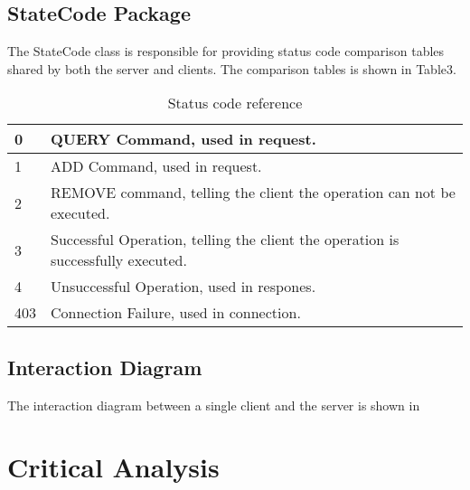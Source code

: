 \documentclass[a4paper]{article}
\begin{document}
\subsection{StateCode Package}
The StateCode class is responsible for providing status code comparison tables shared by both the server and clients. The comparison tables is shown in Table3.
\begin{table}[H]
	\caption{Status code reference}
	\begin{tabular}{|p{0.6cm}|p{10.7cm}|}
		\hline
		0 & QUERY Command, used in request.\\ \hline
		1 & ADD Command, used in request.   \\ \hline
		2 & REMOVE command, telling the client the operation can not be executed. \\ \hline
		3 & Successful Operation, telling the client the operation is successfully executed.\\ \hline
		4 & Unsuccessful Operation, used in respones.\\ \hline
		403 & Connection Failure, used in connection.\\ \hline
	\end{tabular}
\end{table}
\subsection{Interaction Diagram}
The interaction diagram between a single client and the server is shown in 

\section{Critical Analysis}
\end{document}
